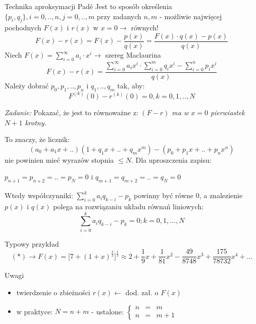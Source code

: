 \begin{frame}{Technika aproksymacji Padé}
	Jest to sposób określenia $\{p_i,q_j\}, i = 0,..,n,j = 0,..,m$ przy zadanych $n,m$ - możliwie najwięcej pochodnych $F(x)$ i $r(x)$ w $x=0\rightarrow$ równych!
    $$F(x) - r(x) = F(x) - \frac{p(x)}{q(x)}=\frac{F(x) \cdot q(x) - p(x)}{q(x)}$$
    Niech $F(x) = \sum_{i=0}^{\infty}a_i \cdot x^i \rightarrow$ szereg Maclaurina
    $$F(x) - r(x) = \frac{\sum_{i=0}^{\infty}a_ix^i \cdot \sum_{i=0}^{m}q_ix^i - \sum_{i=0}^{n}p_ix^i}{q(x)}$$
    Należy dobrać $p_0,p_1,..,p_n$ i $q_1,..,q_m$ tak, aby:
    $$F^{(k)}(0)-r^{(k)}(0) = 0, k=0,1,..,N$$
    
\end{frame}
\begin{frame}
	\begin{flushright}
		\textit{Zadanie: } \quad Pokazać, że jest to równoważne z: \newline\textit{$(F-r)$ ma w $x=0$ pierwiastek $N+1$ krotny.}
	\end{flushright}
    To znaczy, że licznik:
    $$(a_0+a_1x+..)(1+q_1x+..+q_mx^m)-(p_0+p_1x+..+p_nx^n)$$
    nie powinien mieć wyrazów stopnia $\leqslant N$. Dla uproszczenia zapisu:
    \begin{center}
    	$p_{n+1} = p_{n+2}=..=p_N=0$ i $q_{m+1} = q_{m+2} = .. =q_N = 0$
    \end{center}
    Wtedy współczynniki: $\sum_{i=0}^{k}a_iq_{k-i}-p_k$ powinny być równe $0$, a znalezienie $p(x)$ i $q(x)$ polega na rozwiązaniu układu równań liniowych:
    $$\sum_{i=0}^{k}a_iq_{k-i}-p_k = 0; k=0,1,...,N$$
\end{frame}
\begin{frame}{Typowy przykład}
	$$(*) \rightarrow F(x) = \big[7+(1+x)^{\frac{4}{3}}\big]^{\frac{1}{3}} \approx 2+\frac{1}{9}x+\frac{1}{81}x^2-\frac{49}{8748}x^3+\frac{175}{78732}x^4+\ldots $$
    \begin{block}{Uwagi}
    	\begin{itemize}
    	\item twierdzenie o zbieżności $r(x) \leftarrow$ dod. zał. o $F(x)$
        \item w praktyce: $N = n+m$ - ustalone: $\left\{\begin{array}{ccl}
        	n & = & m \\
            n & = & m+1
        \end{array}\right.$
    	\end{itemize}
    \end{block}
\end{frame}
